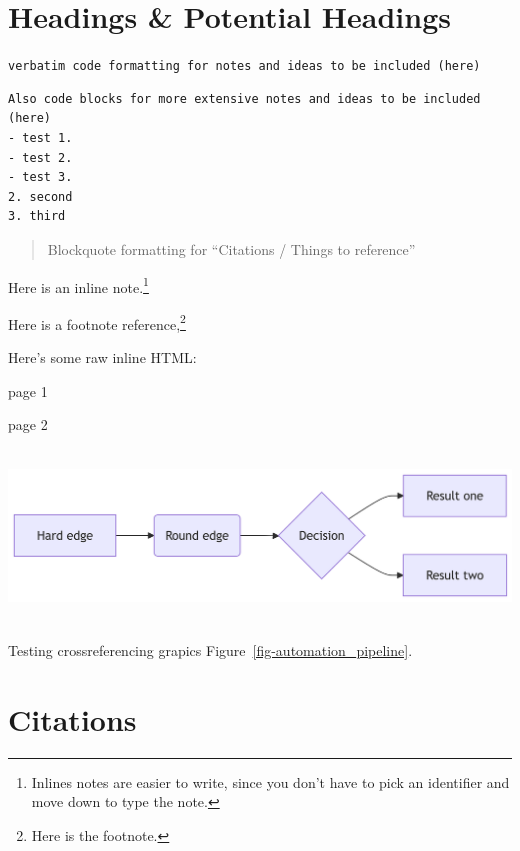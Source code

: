 \documentclass[
  letterpaper,
]{book}
\begin{document}

\section*{Headings \& Potential Headings}\label{sec-heading}


\texttt{verbatim\ code\ formatting\ for\ notes\ and\ ideas\ to\ be\ included\ (here)}

\begin{verbatim}
Also code blocks for more extensive notes and ideas to be included (here)
- test 1. 
- test 2. 
- test 3.
2. second
3. third
\end{verbatim}

\begin{quote}
Blockquote formatting for ``Citations / Things to reference''
\end{quote}

Here is an inline note.\footnote{Inlines notes are easier to write,
  since you don't have to pick an identifier and move down to type the
  note.}

Here is a footnote reference,\footnote{Here is the footnote.}

\renewcommand*{\labelitemi}{\textgreater}

Here's some raw inline HTML:

page 1

\newpage{}

page 2

\includegraphics[width=6.88in,height=1.81in]{ref/references_files/figure-latex/mermaid-figure-2.png}

Testing crossreferencing grapics Figure~\ref{fig-automation_pipeline}.

\section*{Citations}\label{sec-citations}
\end{document}
